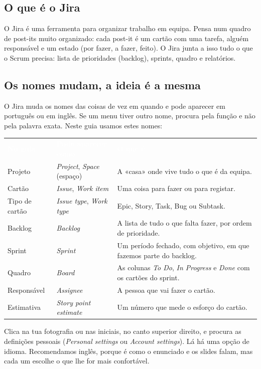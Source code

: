 \documentclass[11pt,a4paper]{article}
\newcommand{\th}[1]{\textcolor{white}{\sffamily\bfseries #1}}
\newcommand{\tabelaini}{\begingroup\small\renewcommand{\arraystretch}{1.45}\rowcolors{2}{azulclaro!55}{white}}
\newcommand{\tabelafim}{\endgroup}
\begin{document}
\subsection{O que é o Jira}

O Jira é uma ferramenta para organizar trabalho em equipa. Pensa num quadro de post-its muito organizado: cada post-it é um cartão com uma tarefa, alguém responsável e um estado (por fazer, a fazer, feito). O Jira junta a isso tudo o que o Scrum precisa: lista de prioridades (backlog), sprints, quadro e relatórios.

\subsection{Os nomes mudam, a ideia é a mesma}

O Jira muda os nomes das coisas de vez em quando e pode aparecer em português ou em inglês. Se um menu tiver outro nome, procura pela função e não pela palavra exata. Neste guia usamos estes nomes:

\tabelaini
\begin{tabularx}{\textwidth}{N{2.6cm} L{4.4cm} Y}
   \th{No guia} & \th{Pode aparecer como} & \th{O que é} \\
  Projeto & \textit{Project}, \textit{Space} (espaço) & A «casa» onde vive tudo o que é da equipa. \\
  Cartão & \textit{Issue}, \textit{Work item} & Uma coisa para fazer ou para registar. \\
  Tipo de cartão & \textit{Issue type}, \textit{Work type} & Epic, Story, Task, Bug ou Subtask. \\
  Backlog & \textit{Backlog} & A lista de tudo o que falta fazer, por ordem de prioridade. \\
  Sprint & \textit{Sprint} & Um período fechado, com objetivo, em que fazemos parte do backlog. \\
  Quadro & \textit{Board} & As colunas \textit{To Do}, \textit{In Progress} e \textit{Done} com os cartões do sprint. \\
  Responsável & \textit{Assignee} & A pessoa que vai fazer o cartão. \\
  Estimativa & \textit{Story point estimate} & Um número que mede o esforço do cartão. \\
  \bottomrule
\end{tabularx}
\tabelafim

\begin{tcolorbox}[dica, title={Dica: mudar a língua do Jira}]
  Clica na tua fotografia ou nas iniciais, no canto superior direito, e procura as definições pessoais (\textit{Personal settings} ou \textit{Account settings}). Lá há uma opção de idioma. Recomendamos inglês, porque é como o enunciado e os slides falam, mas cada um escolhe o que lhe for mais confortável.
\end{tcolorbox}
\end{document}
